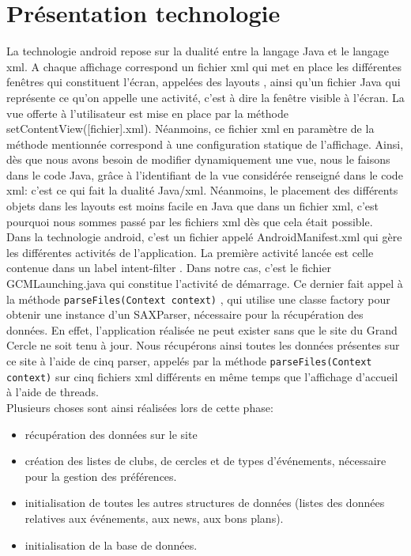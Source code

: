 \documentclass[a4paper, 11px]{article}
\begin{document}
\section{Présentation technologie}
La technologie android repose sur la dualité entre la langage Java et le langage xml. A chaque affichage correspond un fichier xml qui met en place les différentes fenêtres qui constituent l'écran, appelées des \og layouts \fg, ainsi qu'un fichier Java qui représente ce qu'on appelle une activité, c'est à dire la fenêtre visible à l'écran. La vue offerte à l'utilisateur est mise en place par la méthode setContentView([fichier].xml). Néanmoins, ce fichier xml en paramètre de la méthode mentionnée correspond à une configuration statique de l'affichage. Ainsi, dès que nous avons besoin de modifier dynamiquement une vue, nous le faisons dans le code Java, grâce à l'identifiant de la vue considérée renseigné dans le code xml: c'est ce qui fait la dualité Java/xml. Néanmoins, le placement des différents objets dans les layouts est moins facile en Java que dans un fichier xml, c'est pourquoi nous sommes passé par les fichiers xml dès que cela était possible.\\

Dans la technologie android, c'est un fichier appelé AndroidManifest.xml qui gère les différentes activités de l'application. La première activité lancée est celle contenue dans un label \og intent-filter \fg. Dans notre cas, c'est le fichier GCMLaunching.java qui constitue l'activité de démarrage. Ce dernier fait appel à la méthode \texttt{parseFiles(Context context)} , qui utilise une classe factory pour obtenir une instance d'un SAXParser, nécessaire pour la récupération des données. En effet, l'application réalisée ne peut exister sans que le site du Grand Cercle ne soit tenu à jour. Nous récupérons ainsi toutes les données présentes sur ce site à l'aide de cinq parser, appelés par la méthode \texttt{parseFiles(Context context)}
 sur cinq fichiers xml différents en même temps que l'affichage d'accueil à l'aide de threads.\\

\noindent Plusieurs choses sont ainsi réalisées lors de cette phase:
\begin{itemize}
\item récupération des données sur le site
\item création des listes de clubs, de cercles et de types d'événements, nécessaire pour la gestion des préférences.
\item initialisation de toutes les autres structures de données (listes des données relatives aux événements, aux news, aux bons plans).
\item initialisation de la base de données.
\end{itemize}
\end{document}
